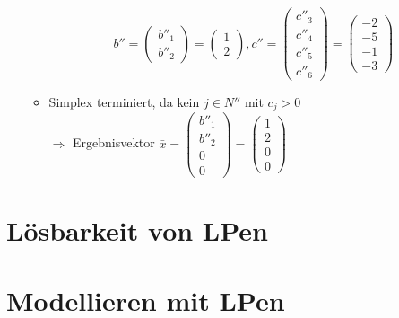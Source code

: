 \documentclass[a4paper,10pt]{article}
\begin{document}
\begin{enumerate}
\begin{itemize}
\[                 b'' = \begin{pmatrix}b''_1 \\ b''_2 \end{pmatrix} 
                   = \begin{pmatrix}1 \\ 2\end{pmatrix},
                 c'' = \begin{pmatrix}c''_3 \\ c''_4 \\ c''_5 \\ c''_6\end{pmatrix} 
                   = \begin{pmatrix}-2 \\ -5 \\ -1 \\ -3 \end{pmatrix}
                \]
        \item   Simplex terminiert, da kein $j \in N''$ mit $c_j > 0$\\
                $\Rightarrow$ Ergebnisvektor $\bar x = \begin{pmatrix}b''_1 \\ b''_2 \\ 0 \\ 0\end{pmatrix} = \begin{pmatrix}1 \\ 2 \\ 0 \\ 0\end{pmatrix}$
        \end{itemize}
\end{enumerate}





\section{Lösbarkeit von LPen}


\section{Modellieren mit LPen}
\end{document}
